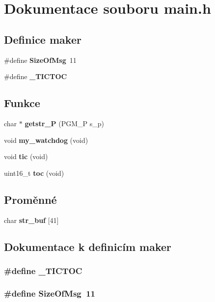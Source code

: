 \section{Dokumentace souboru main.h}
\label{main_8h}
\subsection*{Definice maker}
\begin{DoxyCompactItemize}
\item 
\#define {\bf SizeOfMsg}~11
\item 
\#define {\bf \_\-TICTOC}
\end{DoxyCompactItemize}
\subsection*{Funkce}
\begin{DoxyCompactItemize}
\item 
char $\ast$ {\bf getstr\_\-P} (PGM\_\-P s\_\-p)
\item 
void {\bf my\_\-watchdog} (void)
\item 
void {\bf tic} (void)
\item 
uint16\_\-t {\bf toc} (void)
\end{DoxyCompactItemize}
\subsection*{Proměnné}
\begin{DoxyCompactItemize}
\item 
char {\bf str\_\-buf} [41]
\end{DoxyCompactItemize}


\subsection{Dokumentace k definicím maker}
\subsubsection[{\_\-TICTOC}]{\setlength{\rightskip}{0pt plus 5cm}\#define \_\-TICTOC}\label{main_8h_a29835c64ae960bf66a163842a562abde}
\subsubsection[{SizeOfMsg}]{\setlength{\rightskip}{0pt plus 5cm}\#define SizeOfMsg~11}\label{main_8h_a8639f3cdce498b36b4f11b82726f3857}


